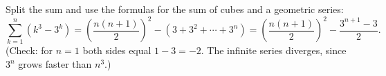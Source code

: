 Split the sum and use the formulas for the sum of cubes and a geometric series:
\[\sum_{k=1}^n\left(k^3-3^k\right)=\left(\dfrac{n(n+1)}{2}\right)^2-\left(3+3^2+\cdots+3^n\right)=\boxed{\left(\dfrac{n(n+1)}{2}\right)^2-\dfrac{3^{n+1}-3}{2}}.\]
(Check: for $n=1$ both sides equal $1-3=-2$. The infinite series diverges, since $3^n$ grows faster than $n^3$.)
